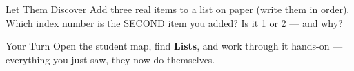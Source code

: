 \documentclass[aspectratio=169]{beamer}
\begin{document}
\begin{frame}{Let Them Discover}
    \Large
    Add three real items to a list on paper (write them in order). Which index number is the SECOND item you added? Is it 1 or 2 — and why?
\end{frame}

\begin{frame}{Your Turn}
    \Large
    Open the student map, find \textbf{Lists}, and work through it
    hands-on --- everything you just saw, they now do themselves.
\end{frame}
\end{document}
